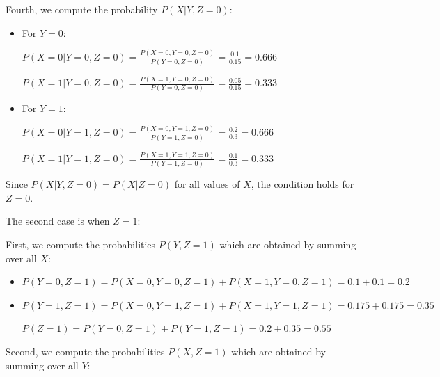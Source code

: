 \documentclass[12pt,letterpaper, onecolumn]{exam}
\begin{document}
\begin{questions}
\begin{parts}
\begin{subparts}
\begin{solution}
                Fourth, we compute the probability $P(X|Y, Z=0)$:

                \begin{itemize}
                    \item For $Y=0$:
                    \begin{center}
                    $\displaystyle{P(X=0|Y=0, Z=0) = \frac{P(X=0, Y=0, Z=0)}{P(Y=0, Z=0)} = \frac{0.1}{0.15} = 0.666}$

                    $\displaystyle{P(X=1|Y=0, Z=0) = \frac{P(X=1, Y=0, Z=0)}{P(Y=0, Z=0)} = \frac{0.05}{0.15} = 0.333}$
                    \end{center}

                    \item For $Y=1$:
                    \begin{center}
                    $\displaystyle{P(X=0|Y=1, Z=0) = \frac{P(X=0, Y=1, Z=0)}{P(Y=1, Z=0)} = \frac{0.2}{0.3} = 0.666}$

                    $\displaystyle{P(X=1|Y=1, Z=0) = \frac{P(X=1, Y=1, Z=0)}{P(Y=1, Z=0)} = \frac{0.1}{0.3} = 0.333}$
                    \end{center}
                \end{itemize}

                Since $P(X|Y, Z=0) = P(X|Z=0)$ for all values of $X$, the condition holds for $Z=0$.

                The second case is when $Z=1$:

                First, we compute the probabilities $P(Y, Z=1)$ which are obtained by summing over all $X$:

                \begin{itemize}
                    \item $P(Y=0, Z=1) = P(X=0, Y=0, Z=1) + P(X=1, Y=0, Z=1) = 0.1 + 0.1 = 0.2$
                    \item $P(Y=1, Z=1) = P(X=0, Y=1, Z=1) + P(X=1, Y=1, Z=1) = 0.175 + 0.175 = 0.35$
                    
                    \begin{center}
                        $P(Z=1) = P(Y=0, Z=1) + P(Y=1, Z=1) = 0.2 + 0.35 = 0.55$
                    \end{center}
                \end{itemize}

                Second, we compute the probabilities $P(X, Z=1)$ which are obtained by summing over all $Y$:


\end{solution}
\end{subparts}
\end{parts}
\end{questions}
\end{document}
